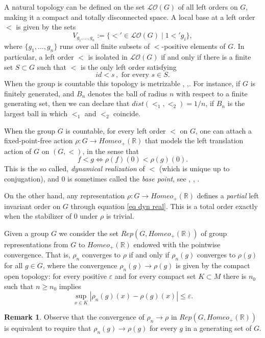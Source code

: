 \documentclass[12pt]{article}
\newcommand{\R}{\mathbb{R}}
\theoremstyle{definition}
\newtheorem{rem}[thm]{Remark}
\begin{document}
A natural topology can be defined on the set $\mathcal{LO}(G)$ of all left orders on $G$, making it a compact and totally disconnected space. A local base at a left order $<$ is given by the sets \[V_{g_1,\ldots,g_n}:=\{<' \in\mathcal{LO}(G)\mid 1 <'g_i\},\]
where $\{g_1,\ldots,g_n\}$ runs over all finite subsets of $<$-positive elements of $G$. In particular, a left order $<$ is isolated in $\mathcal{LO}(G)$ if and only if there is a finite set $S\subset G$ such that $<$ is the only left order satisfying \[id < s\, , \text{ for every $s\in S$}.\]
When the group is countable this topology is metrizable \cite{clay rolfsen}, \cite{GOD},\cite{sikora}. For instance, if $G$ is finitely generated, and $B_n$ denotes the ball of radius $n$ with respect to a finite generating set, then we can declare that $dist(<_1,<_2)=1/n$, if $B_n$ is the largest ball in which $<_1$ and $<_2$ coincide.



When the group $G$ is countable, for every left order $<$ on $G$, one can attach a fixed-point-free action $\rho: G\to Homeo_+(\R)$ that models the left translation action of $G$ on $(G,<)$, in the sense that
\begin{equation} f< g \Leftrightarrow \rho(f)(0)< \rho(g)(0). \label{eq dyn real}\end{equation}
This is the so called, {\em dynamical realization} of $<$ (which is unique up to conjugation), and $0$ is sometimes called the {\em base point}, see \cite{clay rolfsen}, \cite{GOD}, \cite{ghys}.

On the other hand, any representation $\rho: G\to Homeo_+(\R)$ defines a {\em partial} left invariant order on $G$ through equation \ref{eq dyn real}. This is a total order exactly when the stabilizer of $0$ under $\rho$ is trivial.


Given a group $G$ we consider the set $Rep(G,Homeo_+(\R))$ of group representations from $G$ to $Homeo_+(\R)$ endowed with the pointwise convergence. That is, $\rho_n$ converges to $\rho$ if and only if $\rho_n(g)$ converges to $\rho(g)$ for all $g\in G$, where the convergence $\rho_n(g)\to\rho(g)$ is given by the compact open topology: for every positive $\varepsilon$ and for every compact set $K\subset M$ there is $n_0$ such that $n\geq n_0$ implies  \[\sup_{x\in K} |\rho_n(g)(x)-\rho(g)(x)|\leq \varepsilon.\]


\begin{rem} \label{separability} Observe that the convergence of $\rho_n\to \rho$ in $Rep(G, Homeo_+(\R))$ is equivalent to require that $\rho_n(g)\to\rho(g)$ for every $g$ in a generating set of $G$. 
\end{rem}
\end{document}

